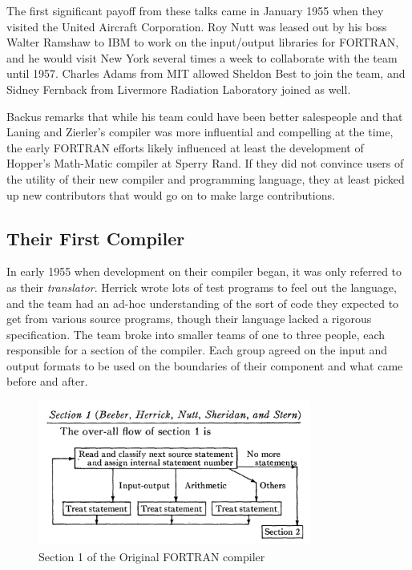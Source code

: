 The first significant payoff from these talks came in January 1955 when they visited the
United Aircraft Corporation. Roy Nutt was leased out by his boss Walter Ramshaw
to IBM to work on the input/output
libraries for FORTRAN, and he would visit New York several times a week to collaborate with
the team until 1957.
Charles Adams from MIT allowed Sheldon Best to join the team,
and Sidney Fernback from Livermore Radiation Laboratory joined as well.

Backus remarks that while his team could have been better salespeople and that
Laning and Zierler's compiler was more influential and compelling at the time, the early FORTRAN efforts
likely influenced at least the development of Hopper's Math-Matic compiler at
Sperry Rand.
If they did not convince users of the utility of their new compiler and programming language,
they at least picked up new contributors that would go on to make large contributions.

\subsection{Their First Compiler}

In early 1955 when development on their compiler began, it was only referred to as their \textit{translator}.
Herrick wrote lots of test programs to feel out the language, and the team had an ad-hoc understanding of the
sort of code they expected to get from various source programs, though their language lacked a
rigorous specification.
The team broke into smaller teams of one to three people, each responsible for a section of the compiler.
Each group agreed on the input and output formats to be used on the boundaries of their component and what came before and after.

\begin{figure}[h]
	\centering
	\includegraphics[width=0.8\textwidth]{resource/dawn/backus-fortran-sec-1.png}
	\caption{Section 1 of the Original FORTRAN compiler\cite{backus_etal_fortran_automatic_coding_system_1957}}
	\label{fig:backus_fortran_compiler}
\end{figure}

